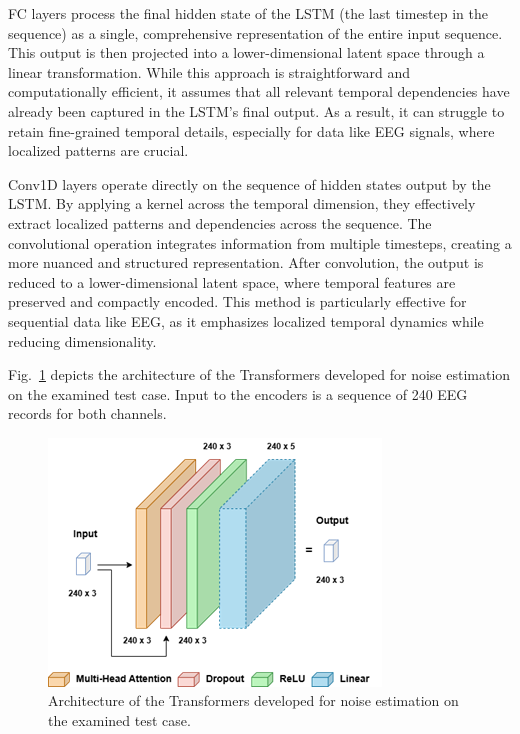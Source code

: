 \documentclass[conference]{IEEEtran}
\begin{document}
FC layers process the final hidden state of the LSTM (the last timestep in the sequence) as a single, comprehensive representation of the entire input sequence. This output is then projected into a lower-dimensional latent space through a linear transformation. While this approach is straightforward and computationally efficient, it assumes that all relevant temporal dependencies have already been captured in the LSTM's final output. As a result, it can struggle to retain fine-grained temporal details, especially for data like EEG signals, where localized patterns are crucial.

Conv1D layers operate directly on the sequence of hidden states output by the LSTM. By applying a kernel across the temporal dimension, they effectively extract localized patterns and dependencies across the sequence. The convolutional operation integrates information from multiple timesteps, creating a more nuanced and structured representation. After convolution, the output is reduced to a lower-dimensional latent space, where temporal features are preserved and compactly encoded. This method is particularly effective for sequential data like EEG, as it emphasizes localized temporal dynamics while reducing dimensionality.

Fig.~\ref{fig:Fig3} depicts the architecture of the Transformers developed for noise estimation on the examined test case. Input to the encoders is a sequence of 240 EEG records for both channels. 


\begin{figure}
    \centering
    \includegraphics[width=0.95\columnwidth]{images/Fig3.png}     
    \vspace{-0.1in}
    \caption{\label{fig:Fig3} Architecture of the Transformers developed for noise estimation on the examined test case.}
\end{figure}
\end{document}

